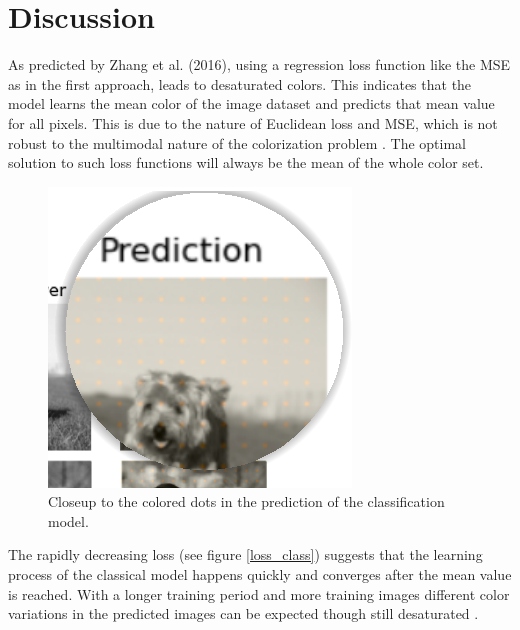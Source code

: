 \documentclass[12pt,letterpaper]{article}
\begin{document}
\section{Discussion}
As predicted by Zhang et al. (2016), using a regression loss function like the MSE as in the first approach, leads to desaturated colors. This indicates that the model learns the mean color of the image dataset and predicts that mean value for all pixels. This is due to the nature of Euclidean loss and MSE, which is not robust to the multimodal nature of the colorization problem \citep{Zhang.2016}. The optimal solution to such loss functions will always be the mean of the whole color set.\\
\begin{figure}
	\centering
	\includegraphics[width=.40\textwidth]{dots.png}
	\caption{Closeup to the colored dots in the prediction of the classification model.}
	\label{dots}
\end{figure}
The rapidly decreasing loss (see figure \ref{loss_class}) suggests that the learning process of the classical model happens quickly and converges after the mean value is reached. With a longer training period and more training images different color variations in the predicted images can be expected though still desaturated \citep{Zhang.2016}.\\
\end{document}

